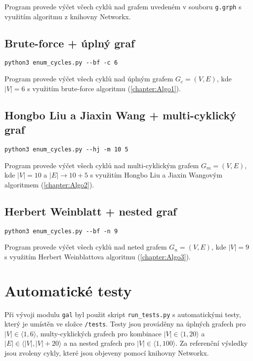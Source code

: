             \vspace*{0.5em}
            Program provede výčet včech cyklů nad grafem uvedeném v souboru \texttt{g.grph} s využitím algoritmu z knihovny Networkx.

        \subsection*{Brute-force + úplný graf}
            \texttt{python3 enum\_cycles.py -{}-bf -c 6}

            \vspace*{0.5em}
            Program provede výčet všech cyklů nad úplným grafem $G_c = (V, E)$, kde $|V| = 6$ s využitím brute-force algoritmu (\ref{chapter:Algo1}).

        \subsection*{Hongbo Liu a Jiaxin Wang + multi-cyklický graf}
            \texttt{python3 enum\_cycles.py -{}-hj -m 10 5}

            \vspace*{0.5em}
            Program provede výčet všech cyklů nad multi-cyklickým grafem $G_m = (V, E)$, kde $|V| = 10$ a $|E| \rightarrow 10 + 5$ s využitím Hongbo Liu a Jiaxin Wangovým algoritmem (\ref{chapter:Algo2}).

        \subsection*{Herbert Weinblatt + nested graf}
            \texttt{python3 enum\_cycles.py -{}-bf -n 9}

            \vspace*{0.5em}
            Program provede výčet všech cyklů nad neted grafem $G_n = (V, E)$, kde $|V| = 9$ s využitím Herbert Weinblattova algoritmu (\ref{chapter:Algo3}).

    \section{Automatické testy}
        Při vývoji modulu \texttt{gal} byl použit skript \texttt{run\_tests.py} s automatickými testy, který je umístěn ve složce \texttt{/tests}. Testy jsou prováděny na úplných grafech pro $|V| \in \langle 1, 6 \rangle$, multy-cyklických grafech pro kombinace $|V| \in \langle 1, 20 \rangle$ a $|E| \in \langle |V|, |V| + 20 \rangle$ a na nested grafech pro $|V| \in \langle 1, 100 \rangle$. Za referenční výsledky jsou zvoleny cykly, které jsou objeveny pomocí knihovny Networkx.

